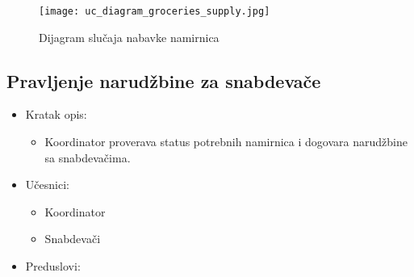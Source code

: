 \begin{figure}[H]
\begin{center}
\texttt{[image: uc\_diagram\_groceries\_supply.jpg]}

    \caption{Dijagram slučaja nabavke namirnica}
    \end{center}
\label{fig:Uc_diagram_groceries_supply}
\end{figure}

\subsection{\bfseries Pravljenje narudžbine za snabdevače}


\begin{itemize}
	\item Kratak opis:
		\begin{itemize}
			\item Koordinator proverava status potrebnih namirnica i dogovara narudžbine sa snabdevačima.
		\end{itemize}
	\item Učesnici:
		\begin{itemize}
		    \item Koordinator
		    \item Snabdevači
		\end{itemize}
	\item Preduslovi:
		\begin{itemize}
		   

\end{itemize}
\end{itemize}
